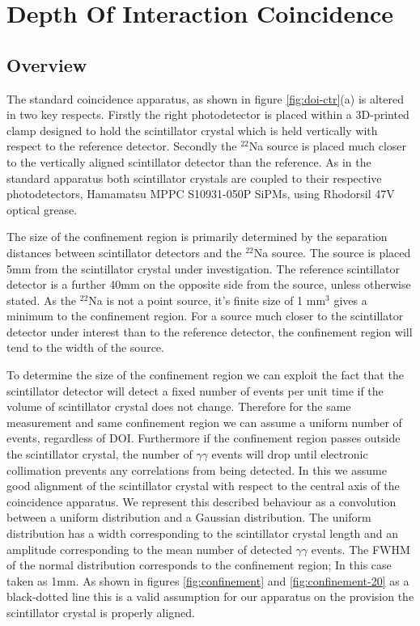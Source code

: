 \section{Depth Of Interaction Coincidence}
\subsection{Overview}
The standard coincidence apparatus, as shown in figure \ref{fig:doi-ctr}(a) is altered in two key respects. Firstly the right photodetector is placed within a 3D-printed clamp designed to hold the scintillator crystal which is held vertically with respect to the reference detector. Secondly the $^{22}$Na source is placed much closer to the vertically aligned scintillator detector than the reference. As in the standard apparatus both scintillator crystals are coupled to their respective photodetectors, Hamamatsu MPPC S10931-050P SiPMs, using Rhodorsil 47V optical grease. 

The size of the confinement region is primarily determined by the separation distances between scintillator detectors and the $^{22}$Na source. The source is placed 5mm from the scintillator crystal under investigation. The reference scintillator detector is a further 40mm on the opposite side from the source, unless otherwise stated. As the $^{22}$Na is not a point source, it's finite size of 1 mm$^3$ gives a minimum to the confinement region. For a source much closer to the scintillator detector under interest than to the reference detector, the confinement region will tend to the width of the source. 

To determine the size of the confinement region we can exploit the fact that the scintillator detector will detect a fixed number of events per unit time if the volume of scintillator crystal does not change. Therefore for the same measurement and same confinement region we can assume a uniform number of events, regardless of DOI. Furthermore if the confinement region passes outside the scintillator crystal, the number of $\gamma\gamma$ events will drop until electronic collimation prevents any correlations from being detected. In this we assume good alignment of the scintillator crystal with respect to the central axis of the coincidence apparatus. We represent this described behaviour as a convolution between a uniform distribution and a Gaussian distribution. The uniform distribution has a width corresponding to the scintillator crystal length and an amplitude corresponding to the mean number of detected $\gamma\gamma$ events. The FWHM of the normal distribution corresponds to the confinement region; In this case taken as 1mm. As shown in figures \ref{fig:confinement} and \ref{fig:confinement-20} as a black-dotted line this is a valid assumption for our apparatus on the provision the scintillator crystal is properly aligned.

